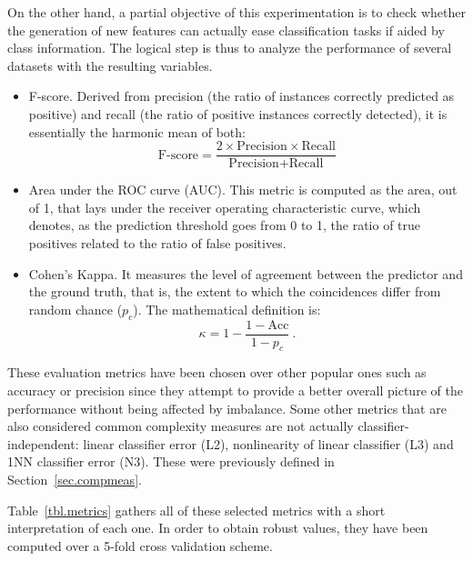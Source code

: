 \documentclass[
	fontsize=11pt, %
	twoside=false, %
	open=any, %
	secnumdepth=1, %
]{kaobook}
\newcommand{\change}[1]{{\color{blue}#1}}
\renewcommand{\change}[1]{#1}
\begin{document}
On the other hand, a partial objective of this experimentation is to check whether the generation of new features can actually ease classification tasks if aided by class information. The logical step is thus to analyze the performance of several datasets with the resulting variables.
\begin{itemize}
  \item F-score. Derived from precision (the ratio of instances correctly predicted as positive) and recall (the ratio of positive instances correctly detected), it is essentially the harmonic mean of both: \begin{equation}\text{F-score}=\frac{2\times\text{Precision}\times\text{Recall}}{\text{Precision}+\text{Recall}}\end{equation}
  \item Area under the ROC curve (AUC). This metric is computed as the area, out of 1, that lays under the receiver operating characteristic curve, which denotes, as the prediction threshold goes from 0 to 1, the ratio of true positives related to the ratio of false positives.
  \item Cohen's Kappa. It measures the level of agreement between the predictor and the ground truth, that is, the extent to which the coincidences differ from random chance ($p_c$). The mathematical definition \change{is}: \begin{equation}\kappa=1-\frac{1-\text{Acc}}{1-p_c}~.\end{equation}
\end{itemize}
These evaluation metrics have been chosen over other popular ones such as accuracy or precision since they attempt to provide a better overall picture of the performance without being affected by imbalance.
Some other metrics that are also considered common complexity measures are not actually classifier-independent: linear classifier error (L2), nonlinearity of linear classifier (L3) and 1NN classifier error (N3). These were previously defined in Section~\ref{sec.compmeas}.

Table~\ref{tbl.metrics} gathers all of these selected metrics with a short interpretation of each one. In order to obtain robust values, they have been computed over a 5-fold cross validation scheme.
\end{document}
